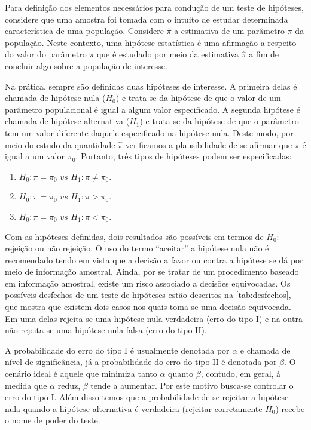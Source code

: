 Para definição dos elementos necessários para condução de um teste de hipóteses, considere que uma amostra foi tomada com o intuito de estudar determinada característica de uma população. Considere $\hat{\pi}$ a estimativa de um parâmetro $\pi$ da população. Neste contexto, uma hipótese estatística é uma afirmação a respeito do valor do parâmetro $\pi$ que é estudado por meio da estimativa $\hat{\pi}$ a fim de concluir algo sobre a população de interesse.

Na prática, sempre são definidas duas hipóteses de interesse. A primeira 
delas é chamada de hipótese nula ($H_0$) e trata-se da hipótese de que
o valor de um parâmetro populacional é igual a algum valor especificado. A segunda hipótese é chamada de hipótese alternativa ($H_1$) e trata-se da hipótese de que o parâmetro tem um valor diferente daquele especificado na hipótese nula. Deste modo, por meio do estudo da quantidade $\hat{\pi}$ verificamos a plausibilidade de se afirmar que $\pi$ é igual a um valor $\pi_0$. Portanto, três tipos de hipóteses podem ser especificadas:

\begin{enumerate}

  \item $H_0: \pi = \pi_0 \, \, vs \, \, H_1: \pi \neq \pi_0$.
  
  \item $H_0: \pi = \pi_0 \, \, vs \, \, H_1: \pi >  \pi_0$.
  
  \item $H_0: \pi = \pi_0 \, \, vs \, \, H_1: \pi < \pi_0$.
  
\end{enumerate}

Com as hipóteses definidas, dois resultados são possíveis em termos de $H_0$: rejeição ou não rejeição. O uso do termo ``aceitar'' a hipótese nula não é recomendado tendo em vista que a decisão a favor ou contra a hipótese se dá por meio de informação amostral. Ainda, por se tratar de um procedimento baseado em informação amostral, existe um risco associado a decisões equivocadas. Os possíveis desfechos de um teste de hipóteses estão descritos na \autoref{tab:desfechos}, que mostra que existem dois casos nos quais toma-se uma decisão equivocada. Em uma delas rejeita-se uma hipótese nula  verdadeira (erro do tipo I) e na outra não rejeita-se uma hipótese nula falsa (erro do tipo II). 

A probabilidade do erro do tipo I é usualmente denotada por $\alpha$ e chamada de nível de significância, já a probabilidade do erro do tipo II é denotada por $\beta$. O cenário ideal é aquele que minimiza tanto $\alpha$ quanto $\beta$, contudo, em geral, à medida que $\alpha$ reduz, $\beta$ tende a aumentar. Por este motivo busca-se controlar o erro do tipo I. Além disso temos que a probabilidade de se rejeitar a hipótese nula quando a hipótese alternativa é verdadeira (rejeitar corretamente $H_0$) recebe o nome de poder do teste.

